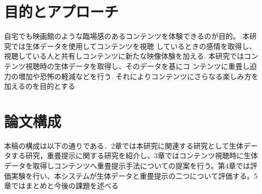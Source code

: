 \section{目的とアプローチ}
自宅でも映画館のような臨場感のあるコンテンツを体験できるのが目的。
本研究では生体データを使用してコンテンツを視聴 しているときの感情を取得し、視聴している人と共有しコンテンツに新たな映像体験を加える.
本研究ではコンテンツ視聴時の生体データを取得し、そのデータを基にコ ンテンツに重畳し迫力の増加や恐怖の軽減などを行う. それによりコンテンツにさらなる楽しみ方を加えるのを目的とする

\label{sec:example}


\section{論文構成}
本稿の構成は以下の通りである．2章では本研究に関連する研究として生体データする研究，重畳提示に関する研究を紹介し、3章ではコンテンツ視聴時に生体データを取得しコンテンツへ重畳提示手法についての提案を行う。第4章では評価実験を行い、本システムが生体データと重畳提示の二つについて評価する。5章ではまとめと今後の課題を述べる

